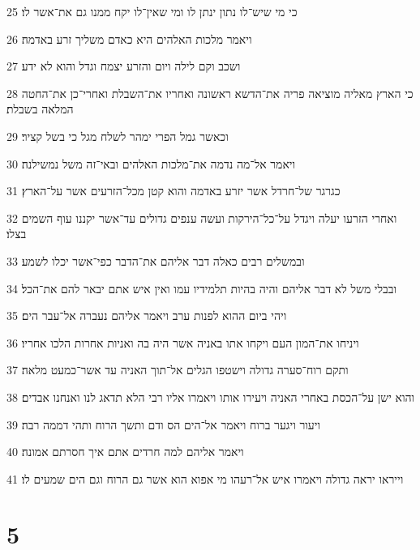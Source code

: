 \par 25 כי מי שיש־לו נתון ינתן לו ומי שאין־לו יקח ממנו גם את־אשר לו׃
\par 26 ויאמר מלכות האלהים היא כאדם משליך זרע באדמה׃
\par 27 ושכב וקם לילה ויום והזרע יצמח וגדל והוא לא ידע׃
\par 28 כי הארץ מאליה מוציאה פריה את־הדשא ראשונה ואחריו את־השבלת ואחרי־כן את־החטה המלאה בשבלת׃
\par 29 וכאשר גמל הפרי ימהר לשלח מגל כי בשל קציר׃
\par 30 ויאמר אל־מה נדמה את־מלכות האלהים ובאי־זה משל נמשילנה׃
\par 31 כגרגר של־חרדל אשר יזרע באדמה והוא קטן מכל־הזרעים אשר על־הארץ׃
\par 32 ואחרי הזרעו יעלה ויגדל על־כל־הירקות ועשה ענפים גדולים עד־אשר יקננו עוף השמים בצלו׃
\par 33 ובמשלים רבים כאלה דבר אליהם את־הדבר כפי־אשר יכלו לשמע׃
\par 34 ובבלי משל לא דבר אליהם והיה בהיות תלמידיו עמו ואין איש אתם יבאר להם את־הכל׃
\par 35 ויהי ביום ההוא לפנות ערב ויאמר אליהם נעברה אל־עבר הים׃
\par 36 ויניחו את־המון העם ויקחו אתו באניה אשר היה בה ואניות אחרות הלכו אחריו׃
\par 37 ותקם רוח־סערה גדולה וישטפו הגלים אל־תוך האניה עד אשר־כמעט מלאה׃
\par 38 והוא ישן על־הכסת באחרי האניה ויעירו אותו ויאמרו אליו רבי הלא תדאג לנו ואנחנו אבדים׃
\par 39 ויעור ויגער ברוח ויאמר אל־הים הס ודם ותשך הרוח ותהי דממה רבה׃
\par 40 ויאמר אליהם למה חרדים אתם איך חסרתם אמונה׃
\par 41 וייראו יראה גדולה ויאמרו איש אל־רעהו מי אפוא הוא אשר גם הרוח וגם הים שמעים לו׃

\chapter{5}

